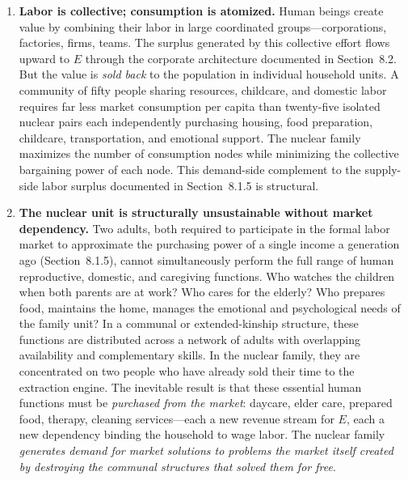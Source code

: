 \begin{enumerate}
    \item \textbf{Labor is collective; consumption is atomized.} Human beings create value by combining their labor in large coordinated groups---corporations, factories, firms, teams. The surplus generated by this collective effort flows upward to $E$ through the corporate architecture documented in Section~8.2. But the value is \textit{sold back} to the population in individual household units. A community of fifty people sharing resources, childcare, and domestic labor requires far less market consumption per capita than twenty-five isolated nuclear pairs each independently purchasing housing, food preparation, childcare, transportation, and emotional support. The nuclear family maximizes the number of consumption nodes while minimizing the collective bargaining power of each node. This demand-side complement to the supply-side labor surplus documented in Section~8.1.5 is structural.

    \item \textbf{The nuclear unit is structurally unsustainable without market dependency.} Two adults, both required to participate in the formal labor market to approximate the purchasing power of a single income a generation ago (Section~8.1.5), cannot simultaneously perform the full range of human reproductive, domestic, and caregiving functions. Who watches the children when both parents are at work? Who cares for the elderly? Who prepares food, maintains the home, manages the emotional and psychological needs of the family unit? In a communal or extended-kinship structure, these functions are distributed across a network of adults with overlapping availability and complementary skills. In the nuclear family, they are concentrated on two people who have already sold their time to the extraction engine. The inevitable result is that these essential human functions must be \textit{purchased from the market}: daycare, elder care, prepared food, therapy, cleaning services---each a new revenue stream for $E$, each a new dependency binding the household to wage labor. The nuclear family \textit{generates demand for market solutions to problems the market itself created by destroying the communal structures that solved them for free}.


\end{enumerate}
